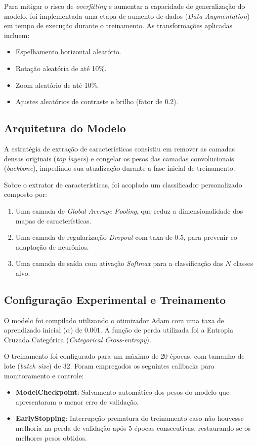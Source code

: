 \documentclass[
	article,			%
	11pt,				%
	oneside,			%
	a4paper,			%
	english,			%
	brazil,				%
	sumario=tradicional
	]{abntex2}
\begin{document}
Para mitigar o risco de \textit{overfitting} e aumentar a capacidade de generalização do modelo, foi implementada uma etapa de aumento de dados (\textit{Data Augmentation}) em tempo de execução durante o treinamento. As transformações aplicadas incluem:
\begin{itemize}
    \item Espelhamento horizontal aleatório.
    \item Rotação aleatória de até 10\%.
    \item Zoom aleatório de até 10\%.
    \item Ajustes aleatórios de contraste e brilho (fator de 0.2).
\end{itemize}

\subsection{Arquitetura do Modelo}

A estratégia de extração de características consistiu em remover as camadas densas originais (\textit{top layers}) e congelar os pesos das camadas convolucionais (\textit{backbone}), impedindo sua atualização durante a fase inicial de treinamento.

Sobre o extrator de características, foi acoplado um classificador personalizado composto por:
\begin{enumerate}
    \item Uma camada de \textit{Global Average Pooling}, que reduz a dimensionalidade dos mapas de características.
    \item Uma camada de regularização \textit{Dropout} com taxa de $0.5$, para prevenir co-adaptação de neurônios.
    \item Uma camada de saída com ativação \textit{Softmax} para a classificação das $N$ classes alvo.
\end{enumerate}


\subsection{Configuração Experimental e Treinamento}

O modelo foi compilado utilizando o otimizador Adam com uma taxa de aprendizado inicial ($\alpha$) de $0.001$. A função de perda utilizada foi a Entropia Cruzada Categórica (\textit{Categorical Cross-entropy}).

O treinamento foi configurado para um máximo de 20 épocas, com tamanho de lote (\textit{batch size}) de 32. Foram empregados os seguintes callbacks para monitoramento e controle:
\begin{itemize}
    \item \textbf{ModelCheckpoint}: Salvamento automático dos pesos do modelo que apresentaram o menor erro de validação.
    \item \textbf{EarlyStopping}: Interrupção prematura do treinamento caso não houvesse melhoria na perda de validação após 5 épocas consecutivas, restaurando-se os melhores pesos obtidos.
\end{itemize}
\end{document}
